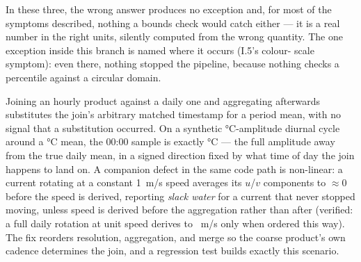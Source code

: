 In these three, the wrong answer produces no exception and, for most of the
symptoms described, nothing a bounds check would catch either --- it is a
real number in the right units, silently computed from the wrong quantity.
The one exception inside this branch is named where it occurs (I.5's colour-
scale symptom): even there, nothing stopped the pipeline, because nothing
checks a percentile against a circular domain.

Joining an hourly product against a daily one and aggregating afterwards
substitutes the join's arbitrary matched timestamp for a period mean, with
no signal that a substitution occurred. On a synthetic \CadAmplitude{}\si{\celsius}-amplitude
diurnal cycle around a \CadMean{}\si{\celsius} mean, the 00:00 sample is exactly
\CadInstant{}\si{\celsius} --- the full amplitude away from the true daily mean, in a
signed direction fixed by what time of day the join happens to land on. A
companion defect in the same code path is non-linear: a current rotating at
a constant 1~m/s speed averages its $u$/$v$ components to $\approx 0$ before
the speed is derived, reporting \emph{slack water} for a current that never
stopped moving, unless speed is derived before the aggregation rather than
after (verified: a full daily rotation at unit speed derives to
\CadCurrentSpeed{}~m/s only when ordered this way). The fix reorders
resolution, aggregation, and merge so the coarse product's own cadence
determines the join, and a regression test builds exactly this scenario.

